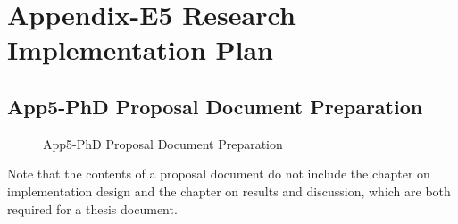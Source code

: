 \clearpage
\pagebreak
\justifying
\renewcommand{\thesection}{E \arabic{section}}

\titleformat{\section}{\normalfont\LARGE\bfseries\color{black}}{\thesection}{10pt}{\LARGE}
\section{Appendix-E5 Research Implementation Plan}\label{sec:App5-Research-Implementation-Plan}

\subsection{App5-PhD Proposal Document Preparation}
\begin{figure}[htbp]
	\begin{center}
		\caption{App5-PhD Proposal Document Preparation}
		\label{fig:App5-01-Research-Implementation-Plan.png}
	\end{center}
\end{figure}

Note that the contents of a proposal document do not include the chapter on implementation design and the chapter on results and discussion, which are both required for a thesis document.

